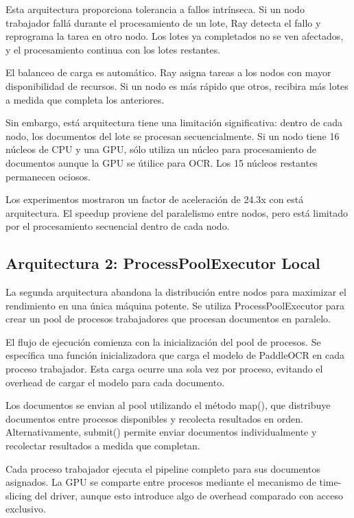 \documentclass[12pt,a4paper,twoside]{book}
\begin{document}
Esta arquitectura proporciona tolerancia a fallos intrínseca. Si un nodo trabajador fallá durante el procesamiento de un lote, Ray detecta el fallo y reprograma la tarea en otro nodo. Los lotes ya completados no se ven afectados, y el procesamiento continua con los lotes restantes.

El balanceo de carga es automático. Ray asigna tareas a los nodos con mayor disponibilidad de recursos. Si un nodo es más rápido que otros, recibira más lotes a medida que completa los anteriores.

Sin embargo, está arquitectura tiene una limitación significativa: dentro de cada nodo, los documentos del lote se procesan secuencialmente. Si un nodo tiene 16 núcleos de CPU y una GPU, sólo utiliza un núcleo para procesamiento de documentos aunque la GPU se útilice para OCR. Los 15 núcleos restantes permanecen ociosos.

Los experimentos mostraron un factor de aceleración de 24.3x con está arquitectura. El speedup proviene del paralelismo entre nodos, pero está limitado por el procesamiento secuencial dentro de cada nodo.

\subsection{Arquitectura 2: ProcessPoolExecutor Local}

La segunda arquitectura abandona la distribución entre nodos para maximizar el rendimiento en una única máquina potente. Se utiliza ProcessPoolExecutor para crear un pool de procesos trabajadores que procesan documentos en paralelo.

El flujo de ejecución comienza con la inicialización del pool de procesos. Se específica una función inicializadora que carga el modelo de PaddleOCR en cada proceso trabajador. Esta carga ocurre una sola vez por proceso, evitando el overhead de cargar el modelo para cada documento.

Los documentos se envian al pool utilizando el método map(), que distribuye documentos entre procesos disponibles y recolecta resultados en orden. Alternativamente, submit() permite enviar documentos individualmente y recolectar resultados a medida que completan.

Cada proceso trabajador ejecuta el pipeline completo para sus documentos asignados. La GPU se comparte entre procesos mediante el mecanismo de time-slicing del driver, aunque esto introduce algo de overhead comparado con acceso exclusivo.
\end{document}
